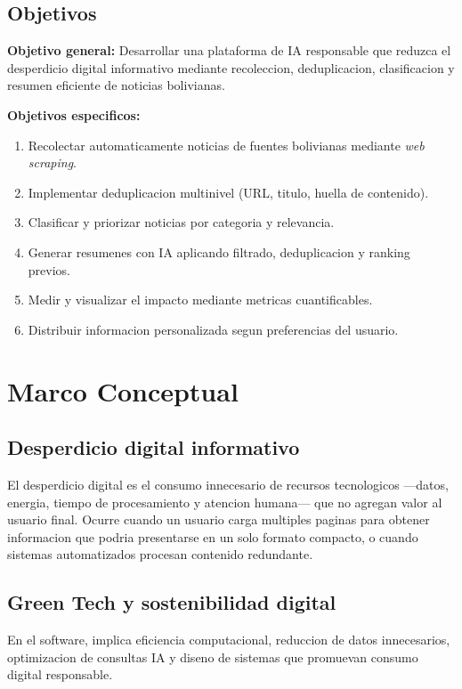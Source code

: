 \documentclass[12pt,oneside]{report}
\begin{document}
\section{Objetivos}

\textbf{Objetivo general:} Desarrollar una plataforma de IA responsable que reduzca el desperdicio digital informativo mediante recoleccion, deduplicacion, clasificacion y resumen eficiente de noticias bolivianas.

\textbf{Objetivos especificos:}
\begin{enumerate}[nosep]
    \item Recolectar automaticamente noticias de fuentes bolivianas mediante \textit{web scraping}.
    \item Implementar deduplicacion multinivel (URL, titulo, huella de contenido).
    \item Clasificar y priorizar noticias por categoria y relevancia.
    \item Generar resumenes con IA aplicando filtrado, deduplicacion y ranking previos.
    \item Medir y visualizar el impacto mediante metricas cuantificables.
    \item Distribuir informacion personalizada segun preferencias del usuario.
\end{enumerate}

\chapter{Marco Conceptual}

\section{Desperdicio digital informativo}

El desperdicio digital es el consumo innecesario de recursos tecnologicos ---datos, energia, tiempo de procesamiento y atencion humana--- que no agregan valor al usuario final. Ocurre cuando un usuario carga multiples paginas para obtener informacion que podria presentarse en un solo formato compacto, o cuando sistemas automatizados procesan contenido redundante.

\section{Green Tech y sostenibilidad digital}

En el software, implica eficiencia computacional, reduccion de datos innecesarios, optimizacion de consultas IA y diseno de sistemas que promuevan consumo digital responsable.
\end{document}
